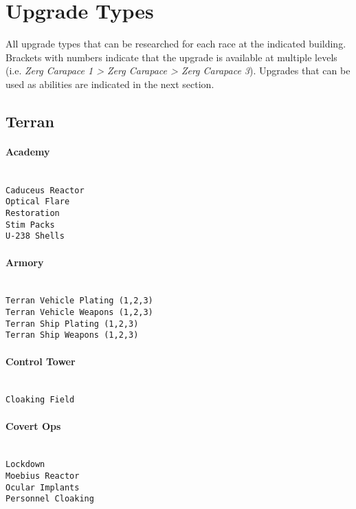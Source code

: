\section{Upgrade Types}
\label{upgradetype}
All upgrade types that can be researched for each race at the indicated building. Brackets with numbers indicate that the upgrade is available at multiple levels (i.e. \textit{Zerg Carapace 1 > Zerg Carapace > Zerg Carapace 3}). Upgrades that can be used as abilities are indicated in the next section.

\subsection{Terran}

\paragraph{Academy} \mbox{}\\
\verb|Caduceus Reactor|\\
\verb|Optical Flare|\\
\verb|Restoration|\\
\verb|Stim Packs|\\
\verb|U-238 Shells|

\paragraph{Armory} \mbox{}\\
\verb|Terran Vehicle Plating (1,2,3)|\\
\verb|Terran Vehicle Weapons (1,2,3)|\\
\verb|Terran Ship Plating (1,2,3)|\\
\verb|Terran Ship Weapons (1,2,3)|

\paragraph{Control Tower} \mbox{}\\
\verb|Cloaking Field|

\paragraph{Covert Ops} \mbox{}\\
\verb|Lockdown|\\
\verb|Moebius Reactor|\\
\verb|Ocular Implants|\\
\verb|Personnel Cloaking|


